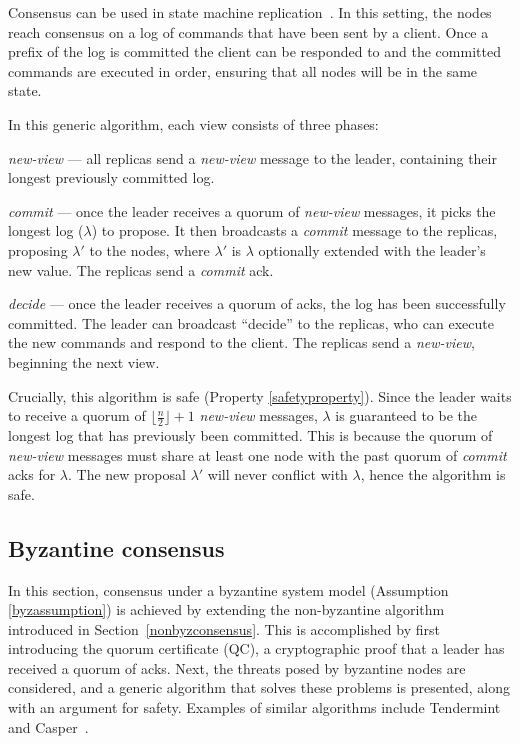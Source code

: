 Consensus can be used in state machine replication~\cite{lamportTimeClocksOrdering1978,schneiderImplementingFaulttolerantServices1990}. In this setting, the nodes reach consensus on a log of commands that have been sent by a client. Once a prefix of the log is committed the client can be responded to and the committed commands are executed in order, ensuring that all nodes will be in the same state.

In this generic algorithm, each view consists of three phases:

\begin{description}
	\item \textit{new-view} --- all replicas send a \textit{new-view} message to the leader, containing their longest previously committed log.
	\item \textit{commit} --- once the leader receives a quorum of \textit{new-view} messages, it picks the longest log ($\lambda$) to propose. It then broadcasts a \textit{commit} message to the replicas, proposing $\lambda'$ to the nodes, where $\lambda'$ is $\lambda$ optionally extended with the leader's new value. The replicas send a \textit{commit} ack.
	\item \textit{decide} --- once the leader receives a quorum of acks, the log has been successfully committed. The leader can broadcast ``decide'' to the replicas, who can execute the new commands and respond to the client. The replicas send a \textit{new-view}, beginning the next view.
\end{description}

Crucially, this algorithm is safe (Property \ref{safetyproperty}). Since the leader waits to receive a quorum of $\lfloor\frac{n}{2}\rfloor + 1$ \textit{new-view} messages, $\lambda$ is guaranteed to be the longest log that has previously been committed. This is because the quorum of \textit{new-view} messages must share at least one node with the past quorum of \textit{commit} acks for $\lambda$. The new proposal $\lambda'$ will never conflict with $\lambda$, hence the algorithm is safe.

\subsection{Byzantine consensus} \label{byzconsensus}
In this section, consensus under a byzantine system model (Assumption \ref{byzassumption}) is achieved by extending the non-byzantine algorithm introduced in Section~\ref{nonbyzconsensus}. This is accomplished by first introducing the quorum certificate (QC), a cryptographic proof that a leader has received a quorum of acks. Next, the threats posed by byzantine nodes are considered, and a generic algorithm that solves these problems is presented, along with an argument for safety. Examples of similar algorithms include Tendermint~\cite{kwonTendermintConsensusMining2014} and Casper~\cite{buterinCasperFriendlyFinality2019}.


